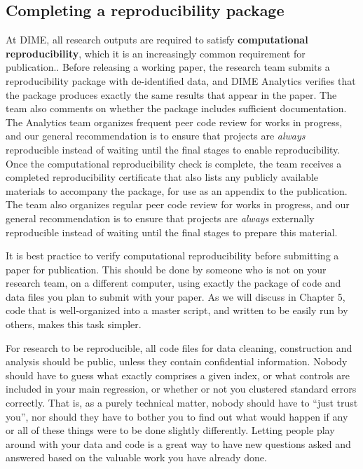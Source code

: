 \subsection{Completing a reproducibility package}
At DIME, all research outputs are required to satisfy \textbf{computational reproducibility},
which it is an increasingly common requirement for publication..
Before releasing a working paper,
the research team submits a reproducibility package with de-identified data,
and DIME Analytics verifies that the package produces
exactly the same results that appear in the paper.
The team also comments on whether the package includes sufficient documentation.
The Analytics team organizes frequent peer code review for works in progress,
and our general recommendation is to ensure that projects
are \textit{always} reproducible instead of waiting
until the final stages to enable reproducibility.
Once the computational reproducibility check is complete,
the team receives a completed reproducibility certificate
that also lists any publicly available materials to accompany the package,
for use as an appendix to the publication.
The team also organizes regular peer code review for works in progress,
and our general recommendation is to ensure that projects
are \textit{always} externally reproducible
instead of waiting until the final stages to prepare this material.

It is best practice to verify computational reproducibility
before submitting a paper for publication.
This should be done by someone who is not on your research team,
on a different computer,
using exactly the package of code and data files
you plan to submit with your paper.
As we will discuss in Chapter 5,
code that is well-organized into a master script,
and written to be easily run by others,
makes this task simpler.

For research to be reproducible,
all code files for data cleaning, construction and analysis
should be public, unless they contain confidential information.
Nobody should have to guess what exactly comprises a given index,
or what controls are included in your main regression,
or whether or not you clustered standard errors correctly.
That is, as a purely technical matter, nobody should have to ``just trust you'',
nor should they have to bother you to find out what would happen
if any or all of these things were to be done slightly differently.\cite{simmons2011false,simonsohn2015specification,wicherts2016degrees}
Letting people play around with your data and code
is a great way to have new questions asked and answered
based on the valuable work you have already done.

